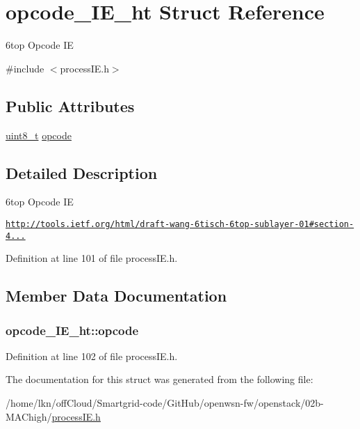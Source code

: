 \hypertarget{structopcode___i_e__ht}{}\section{opcode\+\_\+\+I\+E\+\_\+ht Struct Reference}
\label{structopcode___i_e__ht}


6top Opcode IE  




{\ttfamily \#include $<$process\+I\+E.\+h$>$}

\subsection*{Public Attributes}
\begin{DoxyCompactItemize}
\item 
\hyperlink{_p_e___types_8h_aba7bc1797add20fe3efdf37ced1182c5}{uint8\+\_\+t} \hyperlink{structopcode___i_e__ht_ac5ed5106678e1a99b1f6d1d4ea4f402e}{opcode}
\end{DoxyCompactItemize}


\subsection{Detailed Description}
6top Opcode IE 

\href{http://tools.ietf.org/html/draft-wang-6tisch-6top-sublayer-01#section-4.1.1.5}{\tt http\+://tools.\+ietf.\+org/html/draft-\/wang-\/6tisch-\/6top-\/sublayer-\/01\#section-\/4...} 

Definition at line 101 of file process\+I\+E.\+h.



\subsection{Member Data Documentation}
\subsubsection[{\texorpdfstring{opcode}{opcode}}]{ opcode\+\_\+\+I\+E\+\_\+ht\+::opcode}\hypertarget{structopcode___i_e__ht_ac5ed5106678e1a99b1f6d1d4ea4f402e}{}\label{structopcode___i_e__ht_ac5ed5106678e1a99b1f6d1d4ea4f402e}


Definition at line 102 of file process\+I\+E.\+h.



The documentation for this struct was generated from the following file\+:\begin{DoxyCompactItemize}
\item 
/home/lkn/off\+Cloud/\+Smartgrid-\/code/\+Git\+Hub/openwsn-\/fw/openstack/02b-\/\+M\+A\+Chigh/\hyperlink{process_i_e_8h}{process\+I\+E.\+h}\end{DoxyCompactItemize}
